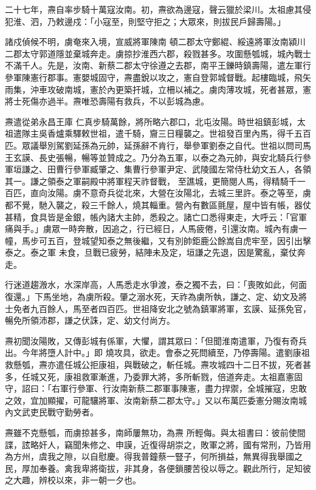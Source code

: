 \begin{pinyinscope}
 二十七年，燾自率步騎十萬寇汝南。初，燾欲為邊寇，聲云獵於梁川。太祖慮其侵犯淮、泗，乃敕邊戍：「小寇至，則堅守拒之；大眾來，則拔民戶歸壽陽。」



 諸戍偵候不明，虜奄來入境，宣威將軍陳南
 頓二郡太守鄭緄、綏遠將軍汝南潁川二郡太守郭道隱並棄城奔走。虜掠抄淮西六郡，殺戮甚多。攻圍懸瓠城，城內戰士不滿千人。先是，汝南、新蔡二郡太守徐遵之去郡，南平王鑠時鎮壽陽，遣左軍行參軍陳憲行郡事。憲嬰城固守，燾盡銳以攻之，憲自登郭城督戰。起樓臨城，飛矢雨集，沖車攻破南城，憲於內更築扞城，立柵以補之。虜肉薄攻城，死者甚眾，憲將士死傷亦過半。燾唯恐壽陽有救兵，不以彭城為慮。



 燾遣從弟永昌王庫
 仁真步騎萬餘，將所略六郡口，北屯汝陽。時世祖鎮彭城，太祖遣隊主吳香爐乘驛敕世祖，遣千騎，齎三日糧襲之。世祖發百里內馬，得千五百匹。眾議舉別駕劉延孫為元帥，延孫辭不肯行，舉參軍劉泰之自代。世祖以問司馬王玄謨、長史張暢，暢等並贊成之。乃分為五軍，以泰之為元帥，與安北騎兵行參軍垣謙之、田曹行參軍臧肇之、集曹行參軍尹定、武陵國左常侍杜幼文五人，各領其一。謙之領泰之軍嗣殿中將軍程天祚督戰，
 至譙城，更簡閱人馬，得精騎千一百匹，直向汝陽。虜不意奇兵從北來，大營在汝陽北，去城三里許。泰之等至，虜都不覺，馳入襲之，殺三千餘人，燒其輜重。營內有數區氈屋，屋中皆有帳，器仗甚精，食具皆是金銀，帳內諸大主帥，悉殺之。諸亡口悉得東走，大呼云：「官軍痛與手。」虜眾一時奔散，因追之，行已經日，人馬疲倦，引還汝南。城內有虜一幢，馬步可五百，登城望知泰之無後繼，又有別帥鉅鹿公餘嵩自虎牢至，因引出擊泰之。泰之軍
 未食，旦戰已疲勞，結陣未及定，垣謙之先退，因是驚亂，棄仗奔走。



 行迷道趨溵水，水深岸高，人馬悉走水爭渡，泰之獨不去，曰：「喪敗如此，何面復還。」下馬坐地，為虜所殺。肇之溺水死，天祚為虜所執，謙之、定、幼文及將士免者九百餘人，馬至者四百匹。世祖降安北之號為鎮軍將軍，玄謨、延孫免官，暢免所領沛郡，謙之伏誅，定、幼文付尚方。



 燾初聞汝陽敗，又傳彭城有係軍，大懼，謂其眾曰：「但聞淮南遣軍，乃復有奇兵出。今年將墮人計中。」即
 燒攻具，欲走。會泰之死問續至，乃停壽陽。遣劉康祖救懸瓠，燾亦遣任城公拒康祖，與戰破之，斬任城。燾攻城四十二日不拔，死者甚多，任城又死，康祖救軍漸進，乃委罪大將，多所斬戮，倍道奔走。太祖嘉憲固守，詔曰：「右軍行參軍、行汝南新蔡二郡軍事陳憲，盡力捍禦，全城摧寇，忠敢之效，宜加顯擢，可龍驤將軍、汝南新蔡二郡太守。」又以布萬匹委憲分賜汝南城內文武吏民戰守勤勞者。



 燾雖不克懸瓠，而虜掠甚多，南師屢無功，為燾
 所輕侮。與太祖書曰：彼前使間諜，詃略奸人，竊聞朱修之、申謨，近復得胡崇之，敗軍之將，國有常刑，乃皆用為方州，虞我之隙，以自慰慶。得我普鐘蔡一豎子，何所損益，無異得我舉國之民，厚加奉養。禽我卑將衛拔，非其身，各便鎖腰苦役以辱之。觀此所行，足知彼之大趣，辨校以來，非一朝一夕也。




\end{pinyinscope}
